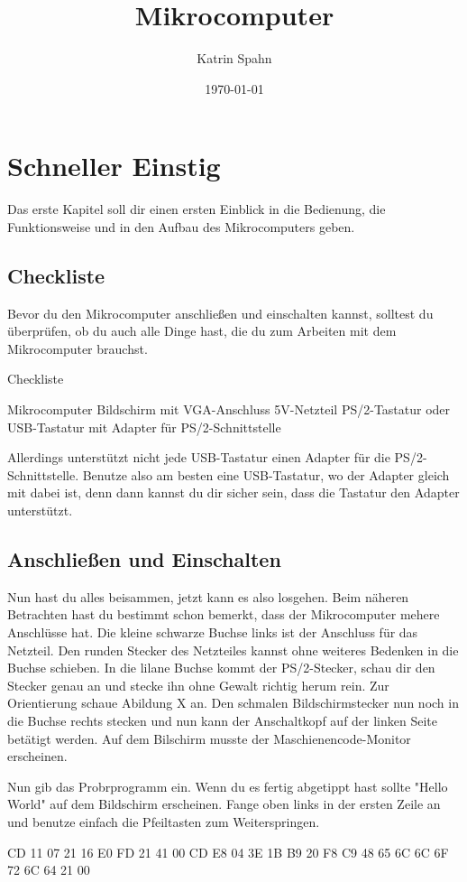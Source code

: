\documentclass[10pt]{book}
\title{Mikrocomputer}
\author{Katrin Spahn}
\date{\today}
\begin{document}
\maketitle

\chapter{Schneller Einstig}

Das erste Kapitel soll dir einen ersten Einblick
in die Bedienung, die Funktionsweise
und in den Aufbau des Mikrocomputers geben.

\section{Checkliste}
Bevor du den Mikrocomputer anschließen und einschalten
kannst, solltest du überprüfen, ob du auch alle Dinge
hast, die du zum Arbeiten mit dem Mikrocomputer brauchst.

Checkliste

Mikrocomputer
Bildschirm mit VGA-Anschluss
5V-Netzteil
PS/2-Tastatur oder USB-Tastatur
mit Adapter für PS/2-Schnittstelle

Allerdings unterstützt nicht jede USB-Tastatur
einen Adapter für die PS/2-Schnittstelle.
Benutze also am besten eine USB-Tastatur,
wo der Adapter gleich mit dabei ist,
denn dann kannst du dir sicher sein,
dass die Tastatur den Adapter unterstützt.

\section{Anschließen und Einschalten}
Nun hast du alles beisammen, jetzt kann es also losgehen.
Beim näheren Betrachten hast du bestimmt schon bemerkt,
dass der Mikrocomputer mehere Anschlüsse hat.
Die kleine schwarze Buchse links
ist der Anschluss für das Netzteil.
Den runden Stecker des Netzteiles kannst
ohne weiteres Bedenken in die Buchse schieben.
In die lilane Buchse kommt der PS/2-Stecker,
schau dir den Stecker genau an und stecke ihn
ohne Gewalt richtig herum rein.
Zur Orientierung schaue Abildung X an.
Den schmalen Bildschirmstecker nun noch
in die Buchse rechts stecken
und nun kann der Anschaltkopf
auf der linken Seite betätigt werden.
Auf dem Bilschirm musste der
Maschienencode-Monitor erscheinen.

Nun gib das Probrprogramm ein.
Wenn du es fertig abgetippt hast sollte
"Hello World" auf dem Bildschirm erscheinen.
Fange oben links in der ersten Zeile an
und benutze einfach die Pfeiltasten zum Weiterspringen.

CD 11 07 21 16 E0 FD 21 41 00 CD E8 04 3E 1B B9 20 F8 C9 48 65 6C 6C 6F 72 6C 64 21 00
\end{document}
